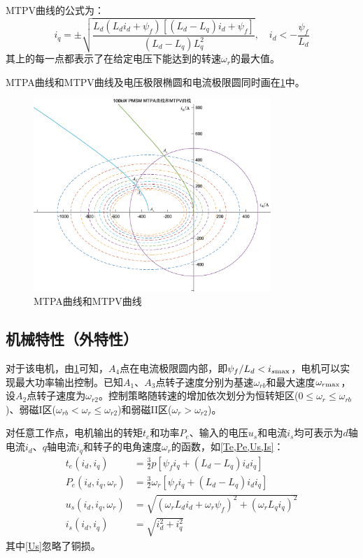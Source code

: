 \documentclass[UTF8]{ctexart}
\numberwithin{figure}{section}
\numberwithin{table}{section}
\begin{document}
MTPV曲线的公式\cite{b}为：
\begin{equation}
	i_q=\pm\sqrt{\frac{L_d(L_di_d+\psi_f)[(L_d-L_q)i_d+\psi_f]}{(L_d-L_q)L_q^2}},\quad i_d<-\frac{\psi_f}{L_d}\label{MTPV}
\end{equation}
其上的每一点都表示了在给定电压下能达到的转速$\omega_r$的最大值。

MTPA曲线和MTPV曲线及电压极限椭圆和电流极限圆同时画在\cref{MTPA and MTPV}中。

\begin{figure}[htbp]
	\centering
	\includegraphics[width=0.8\textwidth]{4}
	\caption{MTPA曲线和MTPV曲线}
	\label{MTPA and MTPV}
\end{figure}

\subsection{机械特性（外特性）}
\label{subsection:2.6}

对于该电机，由\cref{MTPA and MTPV}可知，$A_4$点在电流极限圆内部，即$\psi_f/L_d<i_{s\rm max}$，电机可以实现最大功率输出控制。已知$A_1$、$A_3$点转子速度分别为基速$\omega_{rb}$和最大速度$\omega_{r\rm max}$，设$A_2$点转子速度为$\omega_{r2}$。控制策略随转速的增加依次划分为恒转矩区($0\le\omega_r\le\omega_{rb}$)、弱磁I区($\omega_{rb}<\omega_r\le\omega_{r2}$)和弱磁II区($\omega_r>\omega_{r2}$)。

对任意工作点，电机输出的转矩$t_e$和功率$P_e$、输入的电压$u_s$和电流$i_s$均可表示为$d$轴电流$i_d$、$q$轴电流$i_q$和转子的电角速度$\omega_r$的函数，如\cref{Te,Pe,Us,Is}\cite{b}：
\begin{align}
	t_e(i_d,i_q)          & =\frac{3}{2}p[\psi_fi_q+(L_d-L_q)i_di_q] \label{Te}                    \\
	P_e(i_d,i_q,\omega_r) & =\frac{3}{2}\omega_r[\psi_fi_q+(L_d-L_q)i_di_q] \label{Pe}             \\
	u_s(i_d,i_q,\omega_r) & =\sqrt{(\omega_rL_di_d+\omega_r\psi_f)^2+(\omega_rL_qi_q)^2}\label{Us} \\
	i_s(i_d,i_q)          & =\sqrt{i_d^2+i_q^2}\label{Is}
\end{align}
其中\cref{Us}忽略了铜损。
\end{document}

